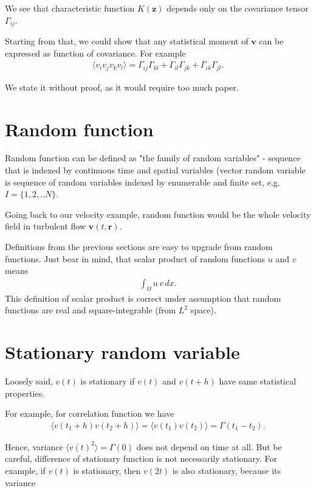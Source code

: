 {We see that characteristic function $K(\bm{z})$ depends only on the covariance tensor $\Gamma_{ij}$.

\bigskip


Starting from that, we could show that any statistical moment of $\bm{v}$ can be expressed as function of covariance. For example
\begin{align}
\langle v_i v_j v_k v_l \rangle = \Gamma_{ij}\Gamma_{kl} + \Gamma_{il}\Gamma_{jk} + \Gamma_{ik}\Gamma_{jl}.
\end{align}

We state it without proof, as it would require too much paper.

\section{Random function}
Random function can be defined as "the family of random variables" - sequence that is indexed by continuous time and spatial variables (vector random variable is sequence of random variables indexed by enumerable and finite set, e.g. $I=\big\{1,2,..N\big\}$.

Going back to our velocity example, random function would be the whole velocity field in turbulent flow
$\bm{v}(t,\bm{r})$.

\bigskip

Definitions from the previous sections are easy to upgrade from random functions.
Just bear in mind, that scalar product of random functions $u$ and $v$ means
\begin{align}
\int_{\Omega} u \, v \, dx.
\end{align}
This definition of scalar product is correct under assumption that random functions are real and square-integrable (from $L^2$ space).


\section{Stationary random variable}
Loosely said, $v(t)$ is stationary if $v(t)$ and $v(t+h)$ have same statistical properties.

For example, for correlation function we have
\begin{align}
\langle v(t_1+h) v(t_2 + h) \rangle = \langle v(t_1) v(t_2) \rangle = \Gamma(t_1 - t_2).
\end{align}

Hence, variance $\langle v(t)^2 \rangle = \Gamma(0)$ does not depend on time at all.
But be careful, difference of stationary function is not necessarily stationary. 
For example, if $v(t)$ is stationary, then $v(2t)$ is also stationary, because its variance

}
